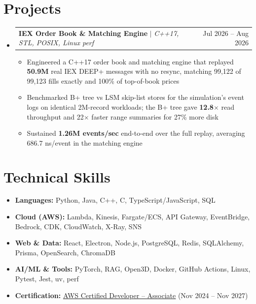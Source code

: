 \documentclass[letterpaper,10pt]{article}
\makeatletter
\newcommand{\resumeItem}[1]{\item{#1}\vspace{-1pt}}
\newcommand{\resumeProjectHeading}[2]{%
  \item
  \begin{tabular*}{\textwidth}{l@{\extracolsep{\fill}}r}
    #1 & #2 \\
  \end{tabular*}\vspace{-6pt}%
}
\newcommand{\resumeSubHeadingListStart}{\begin{itemize}[leftmargin=0in, label={}, itemsep=0pt, topsep=2pt]}
\newcommand{\resumeSubHeadingListEnd}{\end{itemize}}
\newcommand{\resumeItemListStart}{\begin{itemize}[leftmargin=0.18in, itemsep=0pt, topsep=1pt, parsep=0pt]}
\newcommand{\resumeItemListEnd}{\end{itemize}\vspace{0pt}}
\makeatother
\begin{document}
\section{Projects}
\resumeSubHeadingListStart
  \resumeProjectHeading
    {\textbf{IEX Order Book \& Matching Engine} $|$ \textit{C++17, STL, POSIX, Linux perf}}{Jul 2026 -- Aug 2026}
  \resumeItemListStart
    \resumeItem{Engineered a C++17 order book and matching engine that replayed \textbf{50.9M} real IEX DEEP+ messages with no resync, matching 99,122 of 99,123 fills exactly and 100\% of top-of-book prices}
    \resumeItem{Benchmarked B+ tree vs LSM skip-list stores for the simulation's event logs on identical 2M-record workloads; the B+ tree gave \textbf{12.8$\times$} read throughput and 22$\times$ faster range summaries for 27\% more disk}
    \resumeItem{Sustained \textbf{1.26M events/sec} end-to-end over the full replay, averaging 686.7 ns/event in the matching engine}
  \resumeItemListEnd
\resumeSubHeadingListEnd

\section{Technical Skills}
\begin{itemize}[leftmargin=0in, label={}, itemsep=0pt, topsep=2pt]
  \small
  \item{\textbf{Languages:} Python, Java, C++, C, TypeScript/JavaScript, SQL}
  \item{\textbf{Cloud (AWS):} Lambda, Kinesis, Fargate/ECS, API Gateway, EventBridge, Bedrock, CDK, CloudWatch, X-Ray, SNS}
  \item{\textbf{Web \& Data:} React, Electron, Node.js, PostgreSQL, Redis, SQLAlchemy, Prisma, OpenSearch, ChromaDB}
  \item{\textbf{AI/ML \& Tools:} PyTorch, RAG, Open3D, Docker, GitHub Actions, Linux, Pytest, Jest, uv, perf}
  \item{\textbf{Certification:} \href{https://www.credly.com/badges/d2406a97-d937-47de-823b-724981159d3b/public_url}{\underline{AWS Certified Developer -- Associate}} (Nov 2024 -- Nov 2027)}
\end{itemize}
\end{document}
